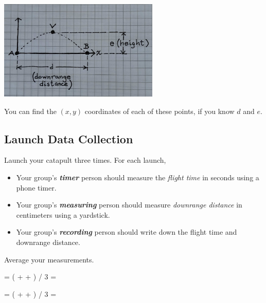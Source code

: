 \begin{center}
    \includegraphics[width=3in]{../AVB.jpg}
\end{center}

You can find the $(x, y)$ coordinates of each of these points, 
if you know $d$ and $e$.





\subsection{Launch Data Collection}

Launch your catapult three times.
For each launch,
\begin{itemize}[nosep]
    \item Your group's {\bfseries\itshape timer} person should 
        measure the {\itshape flight time} 
        in seconds using a phone timer.
    \item Your group's {\bfseries\itshape measuring} person should 
        measure {\itshape downrange distance} 
        in centimeters using a yardstick.
    \item Your group's {\bfseries\itshape recording} person should 
        write down the flight time and downrange distance.
\end{itemize}

Average your measurements.

\begin{tcolorbox}[colback=\myFillinColor,ams align]
     = 
    ( 
         +   + 
    ) / 3 
    = 
\end{tcolorbox}
\begin{tcolorbox}[colback=\myFillinColor,ams align]
    = 
    (  +   + ) / 3 
    = 
\end{tcolorbox}
    


